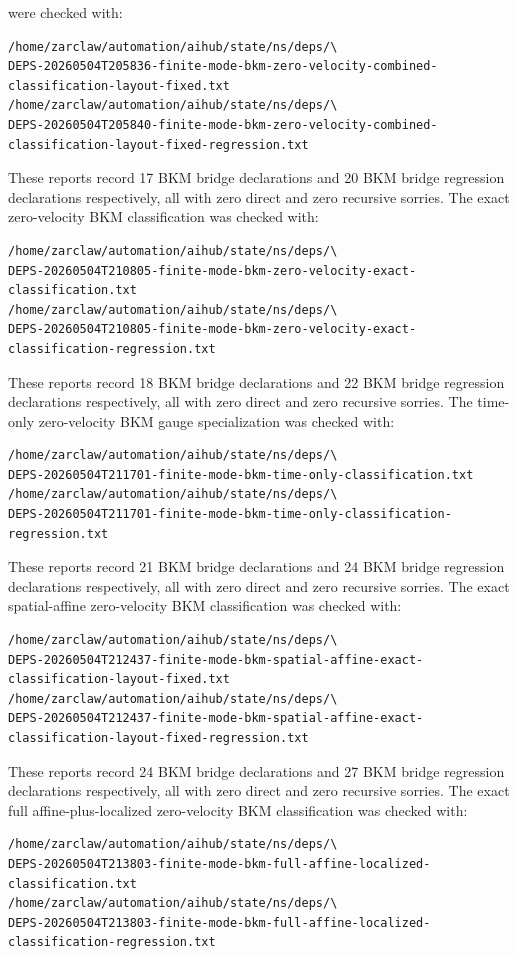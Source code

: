 \documentclass[11pt]{article}
\begin{document}
were checked with:
\begin{verbatim}
/home/zarclaw/automation/aihub/state/ns/deps/\
DEPS-20260504T205836-finite-mode-bkm-zero-velocity-combined-classification-layout-fixed.txt
/home/zarclaw/automation/aihub/state/ns/deps/\
DEPS-20260504T205840-finite-mode-bkm-zero-velocity-combined-classification-layout-fixed-regression.txt
\end{verbatim}
These reports record 17 BKM bridge declarations and 20 BKM bridge regression
declarations respectively, all with zero direct and zero recursive sorries.
The exact zero-velocity BKM classification was checked with:
\begin{verbatim}
/home/zarclaw/automation/aihub/state/ns/deps/\
DEPS-20260504T210805-finite-mode-bkm-zero-velocity-exact-classification.txt
/home/zarclaw/automation/aihub/state/ns/deps/\
DEPS-20260504T210805-finite-mode-bkm-zero-velocity-exact-classification-regression.txt
\end{verbatim}
These reports record 18 BKM bridge declarations and 22 BKM bridge regression
declarations respectively, all with zero direct and zero recursive sorries.
The time-only zero-velocity BKM gauge specialization was checked with:
\begin{verbatim}
/home/zarclaw/automation/aihub/state/ns/deps/\
DEPS-20260504T211701-finite-mode-bkm-time-only-classification.txt
/home/zarclaw/automation/aihub/state/ns/deps/\
DEPS-20260504T211701-finite-mode-bkm-time-only-classification-regression.txt
\end{verbatim}
These reports record 21 BKM bridge declarations and 24 BKM bridge regression
declarations respectively, all with zero direct and zero recursive sorries.
The exact spatial-affine zero-velocity BKM classification was checked with:
\begin{verbatim}
/home/zarclaw/automation/aihub/state/ns/deps/\
DEPS-20260504T212437-finite-mode-bkm-spatial-affine-exact-classification-layout-fixed.txt
/home/zarclaw/automation/aihub/state/ns/deps/\
DEPS-20260504T212437-finite-mode-bkm-spatial-affine-exact-classification-layout-fixed-regression.txt
\end{verbatim}
These reports record 24 BKM bridge declarations and 27 BKM bridge regression
declarations respectively, all with zero direct and zero recursive sorries.
The exact full affine-plus-localized zero-velocity BKM classification was
checked with:
\begin{verbatim}
/home/zarclaw/automation/aihub/state/ns/deps/\
DEPS-20260504T213803-finite-mode-bkm-full-affine-localized-classification.txt
/home/zarclaw/automation/aihub/state/ns/deps/\
DEPS-20260504T213803-finite-mode-bkm-full-affine-localized-classification-regression.txt
\end{verbatim}
\end{document}
